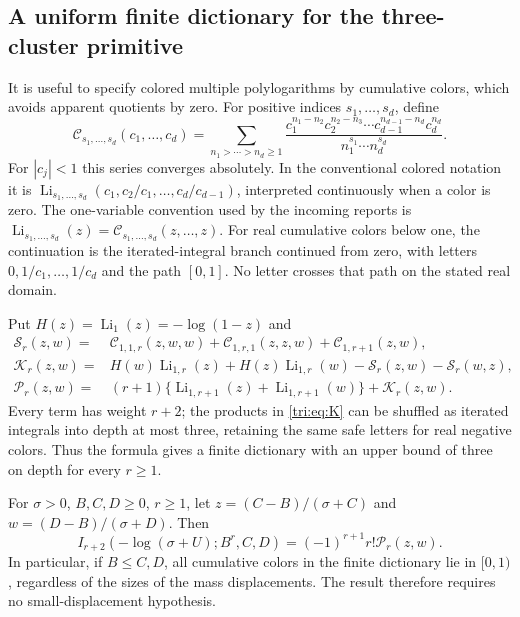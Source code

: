 \subsection{A uniform finite dictionary for the three-cluster primitive}

It is useful to specify colored multiple polylogarithms by cumulative
colors, which avoids apparent quotients by zero. For positive
indices $s_1,\ldots,s_d$, define
\begin{equation}\label{tri:eq:cumulative}
 \mathcal C_{s_1,\ldots,s_d}(c_1,\ldots,c_d)
 =\sum_{n_1>\cdots>n_d\ge1}
 \frac{c_1^{n_1-n_2}c_2^{n_2-n_3}\cdots
            c_{d-1}^{n_{d-1}-n_d}c_d^{n_d}}
      {n_1^{s_1}\cdots n_d^{s_d}}.
\end{equation}
For $|c_j|<1$ this series converges absolutely. In the conventional
colored notation it is
$\operatorname{Li}_{s_1,\ldots,s_d}
(c_1,c_2/c_1,\ldots,c_d/c_{d-1})$, interpreted continuously
when a color is zero. The one-variable convention used by the
incoming reports is
$\operatorname{Li}_{s_1,\ldots,s_d}(z)=
\mathcal C_{s_1,\ldots,s_d}(z,\ldots,z)$.
For real cumulative colors below one, the continuation is the
iterated-integral branch continued from zero, with letters
$0,1/c_1,\ldots,1/c_d$ and the path $[0,1]$. No letter crosses
that path on the stated real domain.

Put $H(z)=\operatorname{Li}_1(z)=-\log(1-z)$ and
\begin{align}
 \mathcal S_r(z,w)
   ={}&\mathcal C_{1,1,r}(z,w,w)
      +\mathcal C_{1,r,1}(z,z,w)
      +\mathcal C_{1,r+1}(z,w),\label{tri:eq:S}\\
 \mathcal K_r(z,w)
   ={}&H(w)\operatorname{Li}_{1,r}(z)
       +H(z)\operatorname{Li}_{1,r}(w)
       -\mathcal S_r(z,w)-\mathcal S_r(w,z),\label{tri:eq:K}\\
 \mathcal P_r(z,w)
   ={}&(r+1)\{\operatorname{Li}_{1,r+1}(z)
                    +\operatorname{Li}_{1,r+1}(w)\}
       +\mathcal K_r(z,w).\label{tri:eq:P}
\end{align}
Every term has weight $r+2$; the products in \eqref{tri:eq:K}
can be shuffled as iterated integrals into depth at most three,
retaining the same safe letters for real negative colors.
Thus the formula gives
a finite dictionary with an upper bound of three on depth for
every $r\ge1$.

\begin{theorem}
\label{tri:thm:three}
For $\sigma>0$, $B,C,D\ge0$, $r\ge1$, let
$z=(C-B)/(\sigma+C)$ and $w=(D-B)/(\sigma+D)$. Then
\begin{equation}\label{tri:eq:three}
 \boxed{\displaystyle
 I_{r+2}(-\log(\sigma+U);B^r,C,D)
       =(-1)^{r+1}r!\mathcal P_r(z,w).}
\end{equation}
In particular, if $B\le C,D$, all cumulative colors in the finite
dictionary lie in $[0,1)$, regardless of the sizes of the mass
displacements. The result therefore requires no small-displacement
hypothesis.
\end{theorem}

